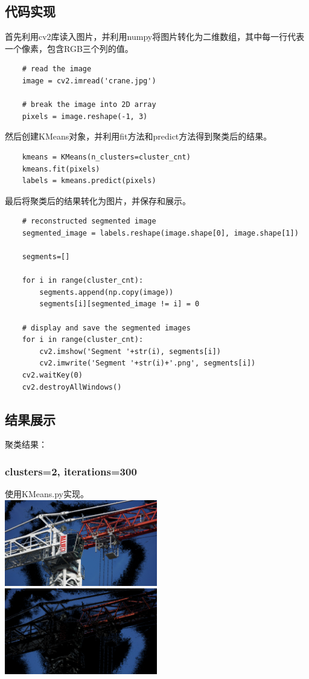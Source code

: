 \documentclass{article}
\begin{document}
\subsection{代码实现}
\lstset{
    language=python,
    frame=shadowbox,
    breaklines=true
}
首先利用cv2库读入图片，并利用numpy将图片转化为二维数组，其中每一行代表一个像素，包含RGB三个列的值。
\begin{lstlisting}
    # read the image
    image = cv2.imread('crane.jpg')
    
    # break the image into 2D array
    pixels = image.reshape(-1, 3)
\end{lstlisting}
然后创建KMeans对象，并利用fit方法和predict方法得到聚类后的结果。
\begin{lstlisting}
    kmeans = KMeans(n_clusters=cluster_cnt)
    kmeans.fit(pixels)
    labels = kmeans.predict(pixels)
\end{lstlisting}
最后将聚类后的结果转化为图片，并保存和展示。
\begin{lstlisting}
    # reconstructed segmented image
    segmented_image = labels.reshape(image.shape[0], image.shape[1])

    segments=[]

    for i in range(cluster_cnt):
        segments.append(np.copy(image))
        segments[i][segmented_image != i] = 0

    # display and save the segmented images
    for i in range(cluster_cnt):
        cv2.imshow('Segment '+str(i), segments[i])
        cv2.imwrite('Segment '+str(i)+'.png', segments[i])
    cv2.waitKey(0)
    cv2.destroyAllWindows()
\end{lstlisting}
\subsection{结果展示}
聚类结果：
\subsubsection{clusters=2, iterations=300}
使用KMeans.py实现。\\
\includegraphics[width=0.5\textwidth]{src/it=300_0.png}
\includegraphics[width=0.5\textwidth]{src/it=300_1.png}\\
\end{document}
